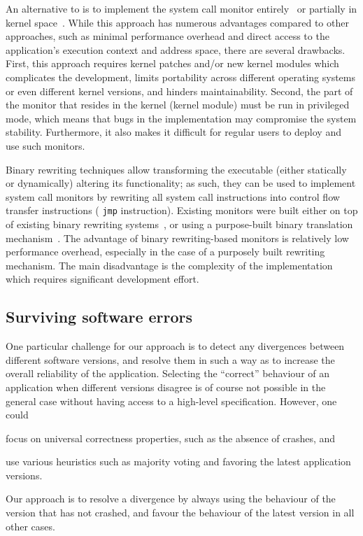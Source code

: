 An alternative to \ptrace is to implement the system call monitor
entirely~\cite{provos2002,cox2006} or partially in kernel space~\cite{ostia}.
While this approach has numerous advantages compared to other approaches, such
as minimal performance overhead and direct access to the application's
execution context and address space, there are several drawbacks.  First, this
approach requires kernel patches and/or new kernel modules which complicates
the development, limits portability across different operating systems or even
different kernel versions, and hinders maintainability. Second, the part of the
monitor that resides in the kernel (\ie kernel module) must be run in
privileged mode, which means that bugs in the implementation may compromise the
system stability. Furthermore, it also makes it difficult for regular users to
deploy and use such monitors.

Binary rewriting techniques allow transforming the executable (either statically
or dynamically) altering its functionality; as such, they can be used to
implement system call monitors by rewriting all system call instructions into 
control flow transfer instructions (\eg
\lstinline[language={[x64]Assembler}]`jmp` instruction). Existing monitors were
built either on top of existing binary rewriting
systems~\cite{onlinevalidation}, or using a purpose-built binary translation
mechanism~\cite{vx32}. The advantage of binary rewriting-based monitors is
relatively low performance overhead, especially in the case of a purposely
built rewriting mechanism. The main disadvantage is the complexity of the
implementation which requires significant development effort.

\subsection{Surviving software errors}

One particular challenge for our approach is to detect any divergences between
different software versions, and resolve them in such a way as to increase the
overall reliability of the application.  Selecting the ``correct'' behaviour of
an application when different versions disagree is of course not possible in
the general case without having access to a high-level specification.  However,
one could%
\begin{inparaenum}[(1)]
\item focus on universal correctness properties, such as the absence of
  crashes, and
\item use various heuristics such as majority voting and favoring the latest
  application versions.
\end{inparaenum}
Our approach is to resolve a divergence by always using the behaviour of the
version that has not crashed, and favour the behaviour of the latest version in
all other cases. %

